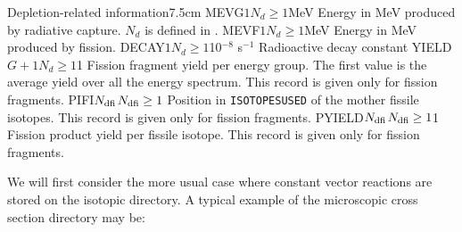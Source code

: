 \begin{DescriptionEnregistrement}{Depletion-related information}{7.5cm}
\label{tabl:tabiso3}
\OptRealEnr
  {MEVG}{$1$}{$N_d \ge 1$}{MeV}
  {Energy in MeV produced by radiative capture. $N_d$ is defined in .}
\OptRealEnr
  {MEVF}{$1$}{$N_d \ge 1$}{MeV}
  {Energy in MeV produced by fission.}
\OptRealEnr
  {DECAY}{$1$}{$N_d \ge 1$}{10$^{-8}$ s$^{-1}$}
  {Radioactive decay constant}
\OptRealEnr
  {YIELD}{$G+1$}{$N_d \ge 1$}{1}
  {Fission fragment yield per energy group. The first value is the average yield
  over all the energy spectrum. This record is given only for fission fragments.}
\OptIntEnr
  {PIFI}{$N_{\rm dfi}$}{$N_{\rm dfi} \ge 1$}
  {Position in {\tt ISOTOPESUSED} of the mother fissile isotopes. This record is
  given only for fission fragments.}
\OptRealEnr
  {PYIELD}{$N_{\rm dfi}$}{$N_{\rm dfi} \ge 1$}{1}
  {Fission product yield per fissile isotope. This record is given only for
  fission fragments.}
\end{DescriptionEnregistrement}

\vskip 0.2cm

We will first consider the more usual case where constant vector reactions are
stored on the isotopic directory. A typical example of the microscopic cross
section directory may be:

